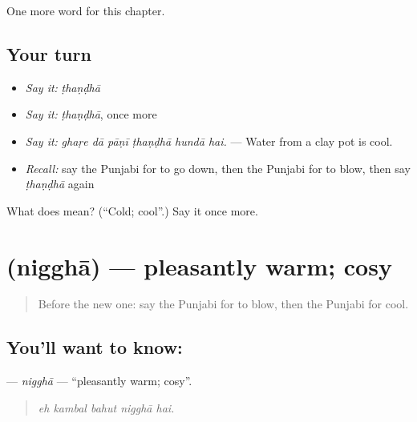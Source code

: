 \begin{grammarlens}[title={What you've built}]
One more word for this chapter.
\end{grammarlens}

\subsection*{Your turn}
\begin{itemize}
\raggedright
  \item \emph{Say it:} \emph{ṭhaṇḍhā}
  \item \emph{Say it:} \emph{ṭhaṇḍhā}, once more
  \item \emph{Say it:} \emph{ghaṛe dā pāṇī ṭhaṇḍhā hundā hai.} — Water from a clay pot is cool.
  \item \emph{Recall:} say the Punjabi for to go down, then the Punjabi for to blow, then say \emph{ṭhaṇḍhā} again
\end{itemize}

\begin{tcolorbox}[breakable,colback=teal!4,colframe=teal!35!black,title={Before you move on}]
What does  mean? (\textquotedblleft{}Cold; cool\textquotedblright{}.) Say it once more.
\end{tcolorbox}
\section[\texorpdfstring{\pa{ਨਿੱਘਾ} (nigghā)}{ਨਿੱਘਾ (nigghā)}]{ (nigghā) — pleasantly warm; cosy}

\label{lesson:PA-C291-niggha}



\begin{quote}
Before the new one: say the Punjabi for to blow, then the Punjabi for cool.
\end{quote}

\subsection*{You'll want to know: }
\textbf{} — \emph{nigghā} — \textquotedblleft{}pleasantly warm; cosy\textquotedblright{}.

\begin{quote}
    
\end{quote}

\begin{quote}
\emph{eh kambal bahut nigghā hai.}
\end{quote}

